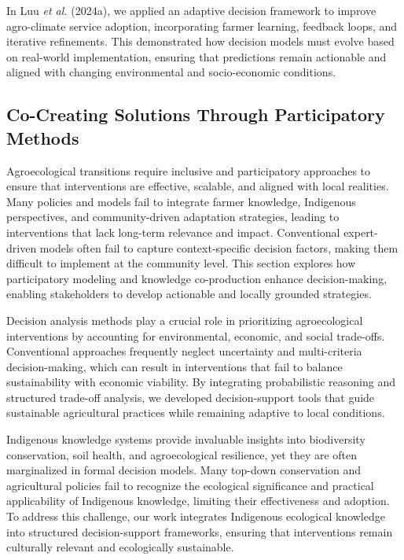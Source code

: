 \documentclass[
]{article}
\begin{document}
In Luu \emph{et al.} (2024a), we applied an adaptive decision framework
to improve agro-climate service adoption, incorporating farmer learning,
feedback loops, and iterative refinements. This demonstrated how
decision models must evolve based on real-world implementation, ensuring
that predictions remain actionable and aligned with changing
environmental and socio-economic conditions.

\hypertarget{co-creating-solutions-through-participatory-methods}{%
\subsection{Co-Creating Solutions Through Participatory
Methods}\label{co-creating-solutions-through-participatory-methods}}

Agroecological transitions require inclusive and participatory
approaches to ensure that interventions are effective, scalable, and
aligned with local realities. Many policies and models fail to integrate
farmer knowledge, Indigenous perspectives, and community-driven
adaptation strategies, leading to interventions that lack long-term
relevance and impact. Conventional expert-driven models often fail to
capture context-specific decision factors, making them difficult to
implement at the community level. This section explores how
participatory modeling and knowledge co-production enhance
decision-making, enabling stakeholders to develop actionable and locally
grounded strategies.

Decision analysis methods play a crucial role in prioritizing
agroecological interventions by accounting for environmental, economic,
and social trade-offs. Conventional approaches frequently neglect
uncertainty and multi-criteria decision-making, which can result in
interventions that fail to balance sustainability with economic
viability. By integrating probabilistic reasoning and structured
trade-off analysis, we developed decision-support tools that guide
sustainable agricultural practices while remaining adaptive to local
conditions.

Indigenous knowledge systems provide invaluable insights into
biodiversity conservation, soil health, and agroecological resilience,
yet they are often marginalized in formal decision models. Many top-down
conservation and agricultural policies fail to recognize the ecological
significance and practical applicability of Indigenous knowledge,
limiting their effectiveness and adoption. To address this challenge,
our work integrates Indigenous ecological knowledge into structured
decision-support frameworks, ensuring that interventions remain
culturally relevant and ecologically sustainable.
\end{document}
